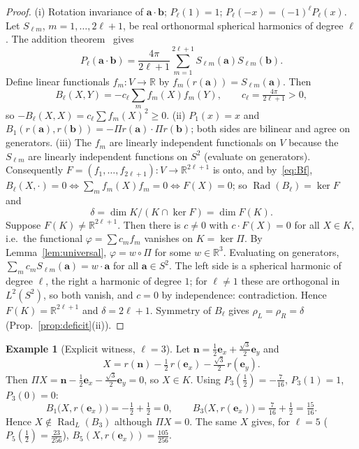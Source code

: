 \documentclass[11pt,a4paper]{article}
\newcommand{\RR}{\mathbb{R}}
\newcommand{\Rad}{\operatorname{Rad}}
\newcommand{\defic}{\delta}
\theoremstyle{plain}
\theoremstyle{definition}
\newtheorem{example}[theorem]{Example}
\begin{document}
\begin{proof}
(i) Rotation invariance of $\mathbf a\cdot\mathbf b$; $P_\ell(1)=1$; $P_\ell(-x)=(-1)^\ell P_\ell(x)$. Let $S_{\ell m}$, $m=1,\dots,2\ell+1$, be real orthonormal spherical harmonics of degree $\ell$. The addition theorem~\cite{AAR99} gives
\begin{equation}\label{eq:addition}
P_\ell(\mathbf a\cdot\mathbf b)=\frac{4\pi}{2\ell+1}\sum_{m=1}^{2\ell+1}S_{\ell m}(\mathbf a)S_{\ell m}(\mathbf b).
\end{equation}
Define linear functionals $f_m\colon V\to\RR$ by $f_m(r(\mathbf a))=S_{\ell m}(\mathbf a)$. Then
\begin{equation}\label{eq:Bf}
B_\ell(X,Y)=-c_\ell\sum_m f_m(X)f_m(Y),\qquad c_\ell=\tfrac{4\pi}{2\ell+1}>0,
\end{equation}
so $-B_\ell(X,X)=c_\ell\sum f_m(X)^2\ge0$.
(ii) $P_1(x)=x$ and $B_1(r(\mathbf a),r(\mathbf b))=-\Pi r(\mathbf a)\cdot\Pi r(\mathbf b)$; both sides are bilinear and agree on generators.
(iii) The $f_m$ are linearly independent functionals on $V$ because the $S_{\ell m}$ are linearly independent functions on $S^2$ (evaluate on generators). Consequently $F=(f_1,\dots,f_{2\ell+1})\colon V\to\RR^{2\ell+1}$ is onto, and by~\eqref{eq:Bf}, $B_\ell(X,\cdot)=0\iff\sum_mf_m(X)f_m=0\iff F(X)=0$; so $\Rad(B_\ell)=\ker F$ and
\[ \defic=\dim K/(K\cap\ker F)=\dim F(K). \]
Suppose $F(K)\neq\RR^{2\ell+1}$. Then there is $c\neq0$ with $c\cdot F(X)=0$ for all $X\in K$, i.e.\ the functional $\varphi=\sum c_mf_m$ vanishes on $K=\ker\Pi$. By Lemma~\ref{lem:universal}, $\varphi=w\circ\Pi$ for some $w\in\RR^3$. Evaluating on generators, $\sum_mc_mS_{\ell m}(\mathbf a)=w\cdot\mathbf a$ for all $\mathbf a\in S^2$. The left side is a spherical harmonic of degree $\ell$, the right a harmonic of degree $1$; for $\ell\neq1$ these are orthogonal in $L^2(S^2)$, so both vanish, and $c=0$ by independence: contradiction. Hence $F(K)=\RR^{2\ell+1}$ and $\defic=2\ell+1$. Symmetry of $B_\ell$ gives $\rho_L=\rho_R=\defic$ (Prop.~\ref{prop:deficit}(ii)).
\end{proof}

\begin{example}[Explicit witness, $\ell=3$]\label{ex:P3}
Let $\mathbf n=\tfrac12\mathbf e_x+\tfrac{\sqrt3}2\mathbf e_y$ and
\[ X=r(\mathbf n)-\tfrac12\,r(\mathbf e_x)-\tfrac{\sqrt3}2\,r(\mathbf e_y). \]
Then $\Pi X=\mathbf n-\tfrac12\mathbf e_x-\tfrac{\sqrt3}2\mathbf e_y=0$, so $X\in K$. Using $P_3(\tfrac12)=-\tfrac7{16}$, $P_3(1)=1$, $P_3(0)=0$:
\[ B_1\bigl(X,r(\mathbf e_x)\bigr)=-\tfrac12+\tfrac12=0,\qquad
 B_3\bigl(X,r(\mathbf e_x)\bigr)=\tfrac7{16}+\tfrac12=\tfrac{15}{16}. \]
Hence $X\notin\Rad_L(B_3)$ although $\Pi X=0$. The same $X$ gives, for $\ell=5$ ($P_5(\tfrac12)=\tfrac{23}{256}$), $B_5(X,r(\mathbf e_x))=\tfrac{105}{256}$.
\end{example}
\end{document}
